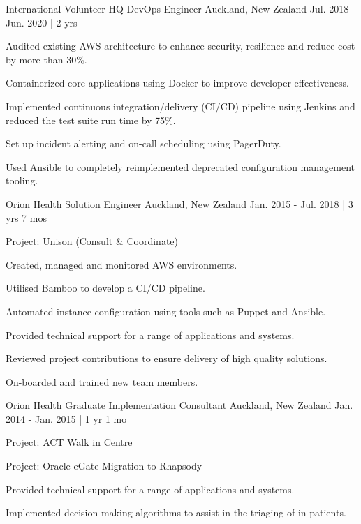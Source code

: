 \begin{cventries}
\cventry
{International Volunteer HQ} %
{DevOps Engineer} %
{Auckland, New Zealand} %
{Jul. 2018 - Jun. 2020 | 2 yrs} %
{ %
\begin{cvitems}
\item {Audited existing AWS architecture to enhance security, resilience and reduce cost by more than 30\%.}
\item {Containerized core applications using Docker to improve developer effectiveness.}
\item {Implemented continuous integration/delivery (CI/CD) pipeline using Jenkins and reduced the test suite run time by 75\%.}
\item {Set up incident alerting and on-call scheduling using PagerDuty.}
\item {Used Ansible to completely reimplemented deprecated configuration management tooling.}
\end{cvitems}
}


\cventry
{Orion Health} %
{Solution Engineer} %
{Auckland, New Zealand} %
{Jan. 2015 - Jul. 2018 | 3 yrs 7 mos} %
{ %
\begin{cvitems}
\item {Project: Unison (Consult \& Coordinate)}
\item {Created, managed and monitored AWS environments.}
\item {Utilised Bamboo to develop a CI/CD pipeline.}
\item {Automated instance configuration using tools such as Puppet and }Ansible.
\item {Provided technical support for a range of applications and }systems.
\item {Reviewed project contributions to ensure delivery of high quality }solutions.
\item {On-boarded and trained new team members.}
\end{cvitems}
}


\cventry
{Orion Health} %
{Graduate Implementation Consultant} %
{Auckland, New Zealand} %
{Jan. 2014 - Jan. 2015 | 1 yr 1 mo} %
{ %
\begin{cvitems}
\item {Project: ACT Walk in Centre}
\item {Project: Oracle eGate Migration to Rhapsody}
\item {Provided technical support for a range of applications and systems.}
\item {Implemented decision making algorithms to assist in the triaging of in-patients.}
\end{cvitems}
}


\end{cventries}
